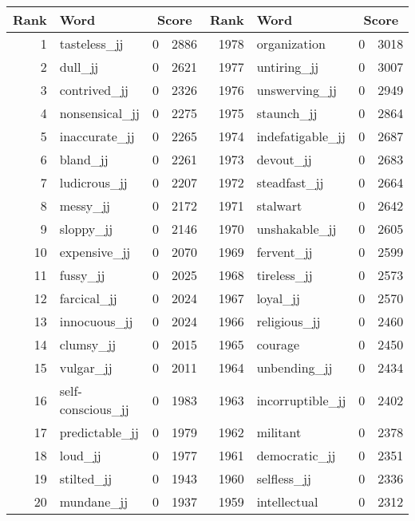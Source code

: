 \begin{table}[tbp]
    \begin{tabular}{| rlr@{.}l | rlr@{.}l |}
    \hline
    \textbf{Rank} & \textbf{Word} & \multicolumn{2}{c|}{\textbf{Score}} & \textbf{Rank} & \textbf{Word} & \multicolumn{2}{c|}{\textbf{Score}} \\
    \hline
    1 & tasteless\_jj & 0 & 2886    &    1978 & organization & 0 & 3018 \\
    2 & dull\_jj & 0 & 2621    &    1977 & untiring\_jj & 0 & 3007 \\
    3 & contrived\_jj & 0 & 2326    &    1976 & unswerving\_jj & 0 & 2949 \\
    4 & nonsensical\_jj & 0 & 2275    &    1975 & staunch\_jj & 0 & 2864 \\
    5 & inaccurate\_jj & 0 & 2265    &    1974 & indefatigable\_jj & 0 & 2687 \\
    6 & bland\_jj & 0 & 2261    &    1973 & devout\_jj & 0 & 2683 \\
    7 & ludicrous\_jj & 0 & 2207    &    1972 & steadfast\_jj & 0 & 2664 \\
    8 & messy\_jj & 0 & 2172    &    1971 & stalwart & 0 & 2642 \\
    9 & sloppy\_jj & 0 & 2146    &    1970 & unshakable\_jj & 0 & 2605 \\
    10 & expensive\_jj & 0 & 2070    &    1969 & fervent\_jj & 0 & 2599 \\
    11 & fussy\_jj & 0 & 2025    &    1968 & tireless\_jj & 0 & 2573 \\
    12 & farcical\_jj & 0 & 2024    &    1967 & loyal\_jj & 0 & 2570 \\
    13 & innocuous\_jj & 0 & 2024    &    1966 & religious\_jj & 0 & 2460 \\
    14 & clumsy\_jj & 0 & 2015    &    1965 & courage & 0 & 2450 \\
    15 & vulgar\_jj & 0 & 2011    &    1964 & unbending\_jj & 0 & 2434 \\
    16 & self-conscious\_jj & 0 & 1983    &    1963 & incorruptible\_jj & 0 & 2402 \\
    17 & predictable\_jj & 0 & 1979    &    1962 & militant & 0 & 2378 \\
    18 & loud\_jj & 0 & 1977    &    1961 & democratic\_jj & 0 & 2351 \\
    19 & stilted\_jj & 0 & 1943    &    1960 & selfless\_jj & 0 & 2336 \\
    20 & mundane\_jj & 0 & 1937    &    1959 & intellectual & 0 & 2312 \\

\end{tabular}
\end{table}
